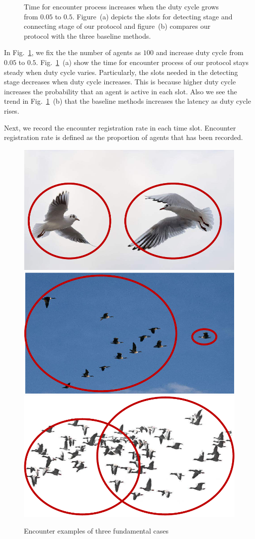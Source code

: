 \begin{figure}[!h]
    \centering
    \hspace{0.01in}
    \caption{Time for encounter process increases when the duty cycle grows from $0.05$ to $0.5$.
    Figure~(a) depicts the slots for detecting stage and connecting stage of our protocol and figure~(b)
    compares our protocol with the three baseline methods.}
    \label{fig_DC}
\end{figure}

In Fig.~\ref{fig_DC}, we fix the the number of agents as $100$ and
increase duty cycle from $0.05$ to $0.5$. Fig.~\ref{fig_DC}~(a) show 
the time for encounter process of our protocol stays steady when duty cycle varies.
Particularly, the slots needed in the detecting stage decreases when duty cycle increases.
This is because higher duty cycle increases the probability that an agent is active in each slot.
Also we see the trend in Fig.~\ref{fig_DC}~(b) that the baseline methods increases the latency as duty cycle rises.

Next, we record the encounter registration rate in each time slot.
Encounter registration rate is defined as the proportion of agents that has been 
recorded. 

\begin{figure}[!t]
    \includegraphics[width=.32\textwidth]{figures/AtoA}
    \includegraphics[width=.32\textwidth]{figures/AtoG}
    \includegraphics[width=.32\textwidth]{figures/GtoG}
    \caption{Encounter examples of three fundamental cases}
    \label{examples}
\end{figure}



